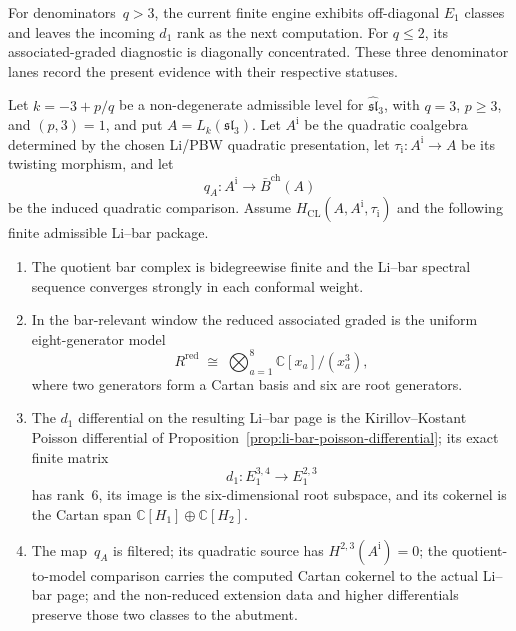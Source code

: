 \begin{remark}
For denominators~$q>3$, the current finite engine exhibits
off-diagonal $E_1$ classes and leaves the incoming $d_1$ rank as the
next computation.  For $q\leq2$, its associated-graded diagnostic is
diagonally concentrated.  These three denominator lanes record the
present evidence with their respective statuses.
\end{remark}

\begin{theorem}%
\label{thm:admissible-sl3-non-koszul-qge3}%
\ClaimStatusConditional
{}%
%
Let $k = -3 + p/q$ be a non-degenerate admissible level for
$\widehat{\mathfrak{sl}}_3$, with $q=3$, $p\geq3$, and
$(p,3)=1$,
and put $A=L_k(\mathfrak{sl}_3)$.  Let
$A^{\mathrm i}$ be the quadratic coalgebra determined by the chosen
Li/PBW quadratic presentation, let
$\tau_{\mathrm i}\colon A^{\mathrm i}\to A$ be its twisting morphism, and let
\[
q_A\colon A^{\mathrm i}\longrightarrow\bar B^{\mathrm{ch}}(A)
\]
be the induced quadratic comparison.  Assume
$H_{\mathrm{CL}}(A,A^{\mathrm i},\tau_{\mathrm i})$ and the following finite
admissible Li--bar package.
\begin{enumerate}[label=\textup{(A\arabic*)}]
\item The quotient bar complex is bidegreewise finite and the Li--bar
 spectral sequence converges strongly in each conformal weight.
\item In the bar-relevant window the reduced associated graded is the
 uniform eight-generator model
 \[
 R^{\mathrm{red}} \;\cong\;
 \bigotimes_{a=1}^{8}\mathbb C[x_a]/(x_a^3),
 \]
 where two generators form a Cartan basis and six are root
 generators.
\item The $d_1$ differential on the resulting Li--bar page is the
 Kirillov--Kostant Poisson differential of
 Proposition~\ref{prop:li-bar-poisson-differential}; its exact
 finite matrix
 \[
 d_1\colon E_1^{3,4}\longrightarrow E_1^{2,3}
 \]
 has rank~$6$, its image is the six-dimensional root subspace, and
 its cokernel is the Cartan span
 $\mathbb C[H_1]\oplus\mathbb C[H_2]$.
\item The map~$q_A$ is filtered; its quadratic source has
 $H^{2,3}(A^{\mathrm i})=0$; the quotient-to-model comparison
 carries the computed Cartan cokernel to the actual Li--bar page; and
 the non-reduced extension data and higher differentials preserve
 those two classes to the abutment.
\end{enumerate}

\end{theorem}
